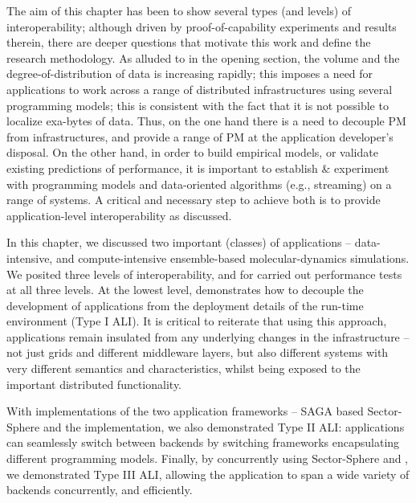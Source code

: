 \documentclass[graybox]{svmult}
\begin{document}
The aim of this chapter has been to show several types (and levels) of
interoperability; although driven by proof-of-capability experiments
and results therein, there are deeper questions that motivate this
work and define the research methodology.  As alluded to in the
opening section, the volume and the degree-of-distribution of data is
increasing rapidly; this imposes a need for applications to work
across a range of distributed infrastructures using several
programming models; this is consistent with the fact that it is not
possible to localize exa-bytes of data.  Thus, on the one hand there
is a need to decouple PM from infrastructures, and provide a range of
PM at the application developer's disposal. On the other hand, in
order to build empirical models, or validate existing predictions of
performance, it is important to establish \& experiment with
programming models and data-oriented algorithms (e.g., streaming) on a
range of systems. %
A critical and necessary step to achieve both is to provide
application-level interoperability as discussed.

In this chapter, we discussed two important (classes) of applications
-- data-intensive, \sagamapreduce \wc and compute-intensive
ensemble-based molecular-dynamics simulations. We posited three levels
of interoperability, and for \sagamapreduce \wc carried out
performance tests at all three levels. %
At the lowest level, \sagamapreduce demonstrates how to
decouple the development of applications from the deployment details
of the run-time environment (Type I ALI).  It is critical to reiterate
that using this approach, applications remain insulated from any
underlying changes in the infrastructure -- not just grids and
different middleware layers, but also different systems with very
different semantics and characteristics, whilst being exposed to the
important distributed functionality.

With implementations of the two application frameworks -- SAGA based
Sector-Sphere and the \smr implementation, we also demonstrated Type
II ALI: applications can seamlessly switch between backends by
switching frameworks encapsulating different programming models.
Finally, by concurrently using Sector-Sphere \mr and \smr, we
demonstrated Type III ALI, allowing the application to span a wide
variety of backends concurrently, and efficiently.
\end{document}

